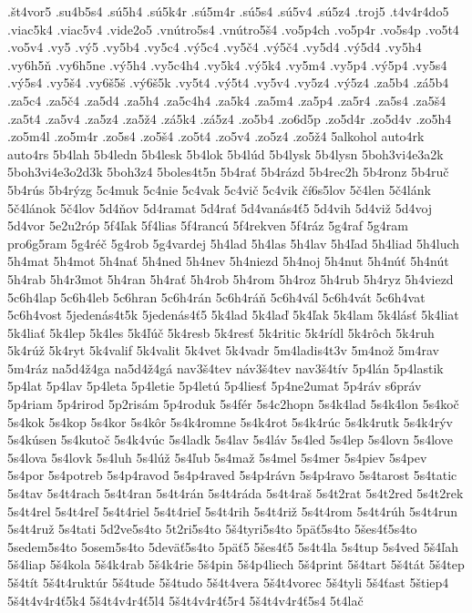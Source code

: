 {.št4vor5
.su4b5s4
.sú5h4
.sú5k4r
.sú5m4r
.sú5s4
.sú5v4
.sú5z4
.troj5
.t4v4r4do5
.viac5k4
.viac5v4
.vide2o5
.vnútro5s4
.vnútro5š4
.vo5p4ch
.vo5p4r
.vo5s4p
.vo5t4
.vo5v4
.vy5
.vý5
.vy5b4
.vy5c4
.vý5c4
.vy5č4
.vý5č4
.vy5d4
.vý5d4
.vy5h4
.vy6h5ň
.vy6h5ne
.vý5h4
.vy5c4h4
.vy5k4
.vý5k4
.vy5m4
.vy5p4
.vý5p4
.vy5s4
.vý5s4
.vy5š4
.vy6š5š
.vý6š5k
.vy5t4
.vý5t4
.vy5v4
.vy5z4
.vý5z4
.za5b4
.zá5b4
.za5c4
.za5č4
.za5d4
.za5h4
.za5c4h4
.za5k4
.za5m4
.za5p4
.za5r4
.za5s4
.za5š4
.za5t4
.za5v4
.za5z4
.za5ž4
.zá5k4
.zá5z4
.zo5b4
.zo6d5p
.zo5d4r
.zo5d4v
.zo5h4
.zo5m4l
.zo5m4r
.zo5s4
.zo5š4
.zo5t4
.zo5v4
.zo5z4
.zo5ž4
5alkohol
auto4rk
auto4rs
5b4lah
5b4ledn
5b4lesk
5b4lok
5b4lúd
5b4lysk
5b4lysn
5boh3vi4e3a2k
5boh3vi4e3o2d3k
5boh3z4
5boles4t5n
5b4rať
5b4rázd
5b4rec2h
5b4ronz
5b4ruč
5b4rús
5b4rýzg
5c4muk
5c4nie
5c4vak
5c4vič
5c4vik
čí6s5lov
5č4len
5č4lánk
5č4lánok
5č4lov
5d4ňov
5d4ramat
5d4rať
5d4vanás4ť5
5d4vih
5d4viž
5d4voj
5d4vor
5e2u2róp
5f4ľak
5f4lias
5f4rancú
5f4rekven
5f4ráz
5g4raf
5g4ram
pro6g5ram
5g4réč
5g4rob
5g4vardej
5h4lad
5h4las
5h4lav
5h4ľad
5h4liad
5h4luch
5h4mat
5h4mot
5h4nať
5h4ned
5h4nev
5h4niezd
5h4noj
5h4nut
5h4núť
5h4nút
5h4rab
5h4r3mot
5h4ran
5h4rať
5h4rob
5h4rom
5h4roz
5h4rub
5h4ryz
5h4viezd
5c6h4lap
5c6h4leb
5c6hran
5c6h4rán
5c6h4ráň
5c6h4vál
5c6h4vát
5c6h4vat
5c6h4vost
5jedenás4t5k
5jedenás4ť5
5k4lad
5k4laď
5k4ľak
5k4lam
5k4lásť
5k4liat
5k4liať
5k4lep
5k4les
5k4ľúč
5k4resb
5k4resť
5k4ritic
5k4rídl
5k4rôch
5k4ruh
5k4rúž
5k4ryt
5k4valif
5k4valit
5k4vet
5k4vadr
5m4ladis4t3v
5m4nož
5m4rav
5m4ráz
na5d4ž4ga
na5d4ž4gá
nav3š4tev
náv3š4tev
nav3š4tív
5p4lán
5p4lastik
5p4lat
5p4lav
5p4leta
5p4letie
5p4letú
5p4liesť
5p4ne2umat
5p4ráv
s6práv
5p4riam
5p4rirod
5p2risám
5p4roduk
5s4fér
5s4c2hopn
5s4k4lad
5s4k4lon
5s4koč
5s4kok
5s4kop
5s4kor
5s4kôr
5s4k4romne
5s4k4rot
5s4k4rúc
5s4k4rutk
5s4k4rýv
5s4kúsen
5s4kutoč
5s4k4vúc
5s4ladk
5s4lav
5s4láv
5s4led
5s4lep
5s4lovn
5s4love
5s4lova
5s4lovk
5s4luh
5s4lúž
5s4ľub
5s4maž
5s4mel
5s4mer
5s4piev
5s4pev
5s4por
5s4potreb
5s4p4ravod
5s4p4raved
5s4p4rávn
5s4p4ravo
5s4tarost
5s4tatic
5s4tav
5s4t4rach
5s4t4ran
5s4t4rán
5s4t4ráda
5s4t4raš
5s4t2rat
5s4t2red
5s4t2rek
5s4t4rel
5s4t4reľ
5s4t4riel
5s4t4rieľ
5s4t4rih
5s4t4riž
5s4t4rom
5s4t4rúh
5s4t4run
5s4t4ruž
5s4tati
5d2ve5s4to
5t2ri5s4to
5š4tyri5s4to
5päť5s4to
5šes4ť5s4to
5sedem5s4to
5osem5s4to
5deväť5s4to
5päť5
5šes4ť5
5s4t4la
5s4tup
5s4ved
5š4ľah
5š4liap
5š4kola
5š4k4rab
5š4k4rie
5š4pin
5š4p4liech
5š4print
5š4tart
5š4tát
5š4tep
5š4tít
5š4t4ruktúr
5š4tude
5š4tudo
5š4t4vera
5š4t4vorec
5š4tyli
5š4ťast
5štiep4
5š4t4v4r4ť5k4
5š4t4v4r4ť5l4
5š4t4v4r4ť5r4
5š4t4v4r4ť5s4
5t4lač
}
